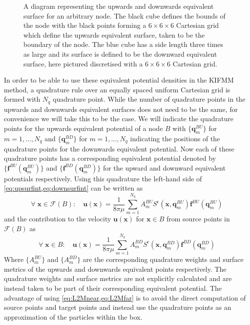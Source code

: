 \begin{figure}[ht]
    \centering
    \resizebox{.6\linewidth}{!}{}
    \caption[A diagram representing the upwards and downwards equivalent surface for an arbitrary node]{A diagram representing the upwards and downwards equivalent surface for an arbitrary node. The black cube defines the bounds of the node with the black points forming a $6 \times 6 \times 6$ Cartesian grid which define the upwards equivalent surface, taken to be the boundary of the node. The blue cube has a side length three times as large and its surface is defined to be the downward equivalent surface, here pictured discretised with a $6 \times 6 \times 6$ Cartesian grid.}
    \label{fig:UpandDownsurf}
\end{figure}

In order to be able to use these equivalent potential densities in the KIFMM method, a quadrature rule over an equally spaced uniform Cartesian grid is formed with $N_q$ quadrature point. While the number of quadrature points in the upwards and downwards equivalent surfaces does not need to be the same, for convenience we will take this to be the case. We will indicate the quadrature points for the upwards equivalent potential of a node $B$ with $\{\bm{q}^{BU}_m\}$ for $m=1,\dots,N_q$ and $\{\bm{q}^{BD}_m\}$ for $m=1,\dots,N_q$ indicating the positions of the quadrature points for the downwards equivalent potential. Now each of these quadrature points has a corresponding equivalent potential denoted by $\{\bm{f}^{BU}(\bm{q}^{BU}_m)\}$ and $\{\bm{f}^{BD}(\bm{q}^{BD}_m)\}$ for the upward and downward equivalent potentials respectively. Using this quadrature the left-hand side of \cref{eq:upsurfint,eq:downsurfint} can be written as 
\begin{equation}
\label{eq:L2Mfar}
    \forall \;\bm{x} \in \mathcal{F}(B): \quad \bm{u}(\bm{x})= \frac{1}{8 \pi \mu} \sum_{m=1}^{N_{q}} A_{m}^{BU} S^\epsilon\left(\bm{x}, \bm{q}_{m}^{B U}\right) \bm{f}^{B U}\left(\bm{q}_{m}^{B U}\right)
\end{equation}
and the contribution to the velocity $\bm{u}(\bm{x})$ for $\bm{x} \in B$ from source points in $\mathcal{F}(B)$ as
\begin{equation}
\label{eq:L2Mnear}
    \forall \;\bm{x} \in B: \quad \bm{u}(\bm{x})= \frac{1}{8 \pi \mu} \sum_{m=1}^{N_{q}} A_{m}^{BD} S^\epsilon\left(\bm{x}, \bm{q}_{m}^{B D}\right) \bm{f}^{B D}\left(\bm{q}_{m}^{B D}\right)
\end{equation}
Where $\{A_{m}^{BU}\}$ and $\{A_{m}^{BD}\}$ are the corresponding quadrature weights and surface metrics of the upwards and downwards equivalent points respectively. The quadrature weights and surface metrics are not explicitly calculated and are instead taken to be part of their corresponding equivalent potential. The advantage of using \cref{eq:L2Mnear,eq:L2Mfar} is to avoid the direct computation of source points and target points and instead use the quadrature points as an approximation of the particles within the box.

